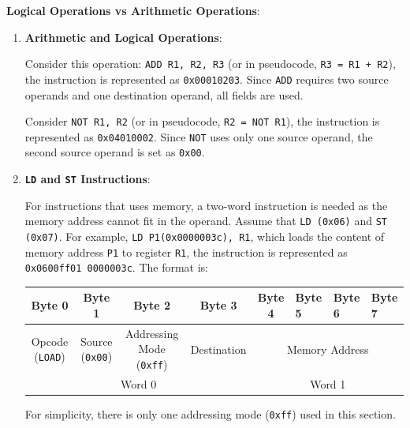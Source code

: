 \textbf{Logical Operations vs Arithmetic Operations}:

\begin{enumerate}

\item \textbf{Arithmetic and Logical Operations}:

Consider this operation: \texttt{ADD R1, R2, R3} (or in pseudocode, \texttt{R3 = R1 + R2}),
the instruction is represented as \texttt{0x00010203}. Since \texttt{ADD} requires two source
operands and one destination operand, all fields are used.

Consider \texttt{NOT R1, R2} (or in pseudocode, \texttt{R2 = NOT R1}), the instruction is
represented as \texttt{0x04010002}. Since \texttt{NOT} uses only one source operand, the
second source operand is set as \texttt{0x00}.

\item \textbf{\texttt{LD} and \texttt{ST} Instructions}:

For instructions that uses memory, a two-word instruction is needed as the memory address
cannot fit in the operand. Assume that \texttt{LD (0x06)} and \texttt{ST (0x07)}.
For example, \texttt{LD P1(0x0000003c), R1}, which loads the content of
memory address \texttt{P1} to register \texttt{R1}, the instruction is represented as
\texttt{0x0600ff01 0000003c}. The format is:
\begin{table}[H]
    \centering
    \begin{tabular}{ccccclll}
    Byte 0                       & Byte 1                                     & Byte 2                                      & Byte 3                                   & Byte 4    & Byte 5    & Byte 6    & Byte 7   \\ \hline
    \multicolumn{1}{|c|}{Opcode (\texttt{LOAD})} & \multicolumn{1}{c|}{Source (\texttt{0x00})} & \multicolumn{1}{c|}{Addressing Mode (\texttt{0xff})} & \multicolumn{1}{c|}{Destination} & \multicolumn{4}{c|}{Memory Address} \\ \hline
    \multicolumn{4}{c}{Word 0}                                                                                                                                         & \multicolumn{4}{c}{Word 1}                  
    \end{tabular}
\end{table}

\begin{remark}
    For simplicity, there is only one addressing mode (\texttt{0xff}) used in this section.
\end{remark}


\end{enumerate}
